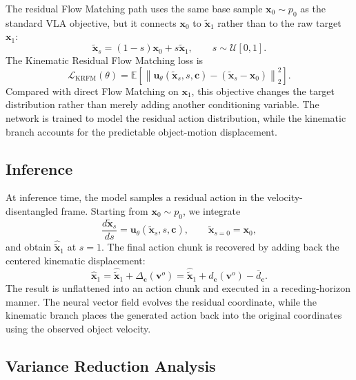\documentclass[10pt,twocolumn,letterpaper]{article}
\begin{document}
The residual Flow Matching path uses the same base sample $\mathbf x_0\sim p_0$
as the standard VLA objective, but it connects $\mathbf x_0$ to
$\widetilde{\mathbf x}_1$ rather than to the raw target $\mathbf x_1$:
\[
    \widetilde{\mathbf x}_s
    =
    (1-s)\mathbf x_0+s\widetilde{\mathbf x}_1,
    \qquad
    s\sim\mathcal U[0,1].
\]
The Kinematic Residual Flow Matching loss is
\begin{equation}
    \mathcal L_{\mathrm{KRFM}}(\theta)
    =
    \mathbb E
    \left[
        \left\|
            \mathbf u_\theta(\widetilde{\mathbf x}_s,s,\mathbf c)
            -
            (\widetilde{\mathbf x}_s-\mathbf x_0)
        \right\|_2^2
    \right].
    \label{eq:krfm_loss}
\end{equation}
Compared with direct Flow Matching on $\mathbf x_1$, this objective changes the
target distribution rather than merely adding another conditioning variable. The
network is trained to model the residual action distribution, while the
kinematic branch accounts for the predictable object-motion displacement.

\subsection{Inference}
\label{subsec:inference}

At inference time, the model samples a residual action in the
velocity-disentangled frame. Starting from $\mathbf x_0\sim p_0$, we integrate
\[
    \frac{d\widetilde{\mathbf x}_s}{ds}
    =
    \mathbf u_\theta(\widetilde{\mathbf x}_s,s,\mathbf c),
    \qquad
    \widetilde{\mathbf x}_{s=0}=\mathbf x_0,
\]
and obtain $\widehat{\widetilde{\mathbf x}}_1$ at $s=1$. The final action chunk
is recovered by adding back the centered kinematic displacement:
\begin{equation}
    \widehat{\mathbf x}_1
    =
    \widehat{\widetilde{\mathbf x}}_1
    +
    \Delta_{\mathbf c}(\mathbf v^{o})
    =
    \widehat{\widetilde{\mathbf x}}_1
    +
    d_{\mathbf c}(\mathbf v^{o})
    -
    \bar d_{\mathbf c}.
    \label{eq:residual_to_raw_inference}
\end{equation}
The result is unflattened into an action chunk and executed in a
receding-horizon manner. The neural vector field evolves the residual
coordinate, while the kinematic branch places the generated action back into
the original coordinates using the observed object velocity.



\subsection{Variance Reduction Analysis}
\label{subsec:variance_reduction}
\end{document}
